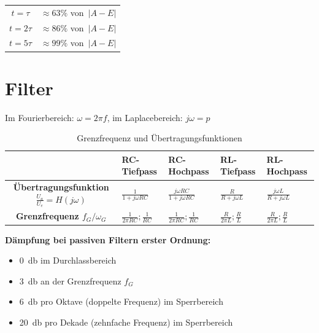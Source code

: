 \documentclass[a5paper, 12pt]{scrartcl}
\begin{document}

\begin{table}
  \centering
  \begin{tabular}{cc}
    \toprule
    \(t=\tau\) & \(\approx 63\%\) von\ \(|A-E|\)\\
    \(t=2\tau\) & \(\approx 86\%\) von\ \(|A-E|\)\\
    \(t=5\tau\) & \(\approx 99\%\) von\ \(|A-E|\)\\
    \bottomrule
  \end{tabular}
\end{table}

\section{Filter}

Im Fourierbereich: \(\omega = 2 \pi f\), im Laplacebereich: \(j\omega = p\)

\begin{table}[H]
  \centering
  \begin{tabular}{cllll}
    \toprule
    & \textbf{RC-Tiefpass} & \textbf{RC-Hochpass} & \textbf{RL-Tiefpass} & \textbf{RL-Hochpass}\\
    \midrule
    \textbf{Übertragungsfunktion \(\frac{U_a}{U_e} = H(j\omega)\)} & \(\frac{1}{1 + j\omega R C}\) & \(\frac{j\omega RC}{1 + j\omega RC}\) & \(\frac{R}{R + j \omega L}\)& \(\frac{j\omega L}{R + j \omega L}\) \\[1em]
    \textbf{Grenzfrequenz \(f_G / \omega_G\)} & \(\frac{1}{2 \pi R C}; \frac{1}{RC}\) & \(\frac{1}{2 \pi R C}; \frac{1}{RC}\) & \(\frac{R}{2 \pi L}; \frac{R}{L}\) & \(\frac{R}{2 \pi L}; \frac{R}{L}\)\\
    \bottomrule
  \end{tabular}
  \caption{Grenzfrequenz und Übertragungsfunktionen}
\end{table}

\textbf{Dämpfung bei passiven Filtern erster Ordnung:}

\begin{itemize}
\item \SI{0}{\decibel} im Durchlassbereich
\item \SI{3}{\decibel} an der Grenzfrequenz \(f_G\)
\item \SI{6}{\decibel} pro Oktave (doppelte Frequenz) im Sperrbereich
\item \SI{20}{\decibel} pro Dekade (zehnfache Frequenz) im Sperrbereich
\end{itemize}
\end{document}
